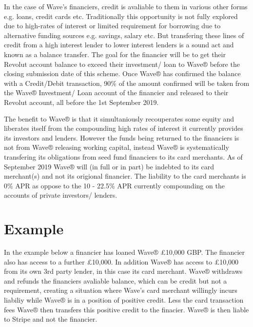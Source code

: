 \documentclass[letterpaper,10pt,openany,oneside,english]{sphinxmanual}
\begin{document}
In the case of Wave’s financiers, credit is avaliable to them in various other forms e.g. loans, credit cards etc. Traditionally this opportunity is not fully explored due to high-rates of interest or limited requirement for borrowing due to alternative funding sources e.g. savings, salary etc. But transfering these lines of credit from a high interest lender to lower interest lenders is a sound act and known as a balance transfer. The goal for the financier will be to get their Revolut account balance to exceed their investment/ loan to Wave® before the closing submission date of this scheme. Once Wave® has confirmed the balance with a Credit/Debit transaction, 90\% of the amount confirmed will be taken from the Wave® Investment/ Loan account of the financier and released to their Revolut account, all before the 1st September 2019.

The benefit to Wave® is that it simultaniously recouperates some equity and liberates itself from the compounding high rates of interest it currently provides its investors and lenders. However the funds being returned to the financiers is not from Wave® releasing working capital, instead Wave® is systematically transfering its obligations from seed fund financiers to its card merchants. As of September 2019 Wave® will (in full or in part) be indebted to its card merchant(s) and not its origional financier. The liability to the card merchants is 0\% APR as oppose to the 10 - 22.5\% APR currently compounding on the accounts of private investors/ lenders.


\section{Example}
\label{\detokenize{howitworks:example}}
In the example below a financier has loaned Wave® £10,000 GBP. The financier also has access to a further £10,000. In addition Wave® has access to £10,000 from its own 3rd party lender, in this case its card merchant.  Wave® withdraws and refunds the financiers avaliable balance, which can be credit but not a requirement, creating a situation where Wave’s card merchant willingly incurs liabiliy while Wave® is in a position of positive credit. Less the card transaction fees Wave® then transfers this positive credit to the finacier. Wave® is then liable to Stripe and not the financier.
\end{document}
